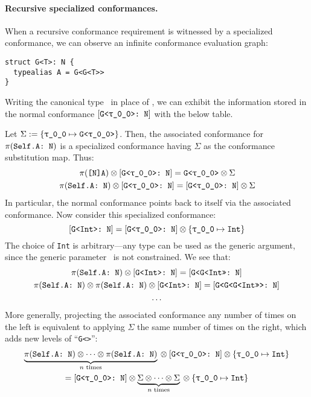 \documentclass[../generics]{subfiles}
\begin{document}
\paragraph{Recursive specialized conformances.}
When a recursive conformance requirement is witnessed by a specialized conformance, we can observe an infinite conformance evaluation graph:
\begin{Verbatim}
struct G<T>: N {
  typealias A = G<G<T>>
}
\end{Verbatim}
Writing the canonical type \rT\ in place of \tT, we can exhibit the information stored in the normal conformance $\ConfReq{G<\rT>}{N}$ with the below table.
\begin{center}
{
}
\end{center}
Let $\Sigma:=\SubstMap{\SubstType{\rT}{G<\rT>}}$. Then, the associated conformance for $\pi(\texttt{Self.A:~N})$ is a specialized conformance having $\Sigma$ as the conformance substitution map. Thus:
\begin{gather*}
\AssocType{[N]A} \otimes \ConfReq{G<\rT>}{N} = \texttt{G<\rT>}\otimes \Sigma\\
\SelfAToN \otimes \ConfReq{G<\rT>}{N} = \ConfReq{G<\rT>}{N}\otimes \Sigma
\end{gather*}
In particular, the normal conformance points back to itself via the associated conformance. Now consider this specialized conformance:
\[\ConfReq{G<Int>}{N}=\ConfReq{G<\rT>}{N}\otimes\SubstMap{\SubstType{\rT}{Int}}\]
The choice of \texttt{Int} is arbitrary---any type can be used as the generic argument, since the generic parameter \rT\ is not constrained. We see that:
\begin{gather*}
\pi(\texttt{Self.A:~N})\otimes[\texttt{G<Int>:~N}]=[\texttt{G<G<Int>>:~N}]\\
\pi(\texttt{Self.A:~N})\otimes\pi(\texttt{Self.A:~N})\otimes[\texttt{G<Int>:~N}]=[\texttt{G<G<G<Int>>>:~N}]\\
\ldots
\end{gather*}
More generally, projecting the associated conformance any number of times on the left is equivalent to applying $\Sigma$ the same number of times on the right, which adds new levels of ``\texttt{G<>}'':
\begin{gather*}
\underbrace{\SelfAToN\otimes\cdots\otimes\SelfAToN}_{\textrm{$n$ times}}{} \otimes\ConfReq{G<\rT>}{N}\otimes \SubstMap{\SubstType{\rT}{Int}}\\
= \ConfReq{G<\rT>}{N}\otimes \underbrace{\Sigma\otimes\cdots\otimes \Sigma}_{\textrm{$n$ times}}{} \otimes \SubstMap{\SubstType{\rT}{Int}}
\end{gather*}
\end{document}
